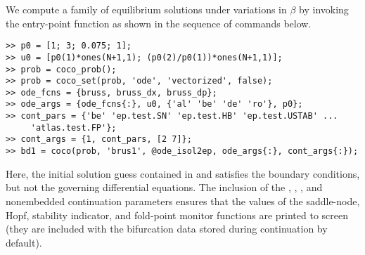 We compute a family of equilibrium solutions under variations in $\beta$ by invoking the  entry-point function as shown in the sequence of commands below.
\begin{lstlisting}[language=coco-highlight]
>> p0 = [1; 3; 0.075; 1];
>> u0 = [p0(1)*ones(N+1,1); (p0(2)/p0(1))*ones(N+1,1)];
>> prob = coco_prob();
>> prob = coco_set(prob, 'ode', 'vectorized', false);
>> ode_fcns = {bruss, bruss_dx, bruss_dp};
>> ode_args = {ode_fcns{:}, u0, {'al' 'be' 'de' 'ro'}, p0};
>> cont_pars = {'be' 'ep.test.SN' 'ep.test.HB' 'ep.test.USTAB' ...
     'atlas.test.FP'};
>> cont_args = {1, cont_pars, [2 7]};
>> bd1 = coco(prob, 'brus1', @ode_isol2ep, ode_args{:}, cont_args{:});
\end{lstlisting}
Here, the initial solution guess contained in  and  satisfies the boundary conditions, but not the governing differential equations. The inclusion of the , , , and  nonembedded continuation parameters ensures that the values of the saddle-node, Hopf, stability indicator, and fold-point monitor functions are printed to screen (they are included with the bifurcation data stored during continuation by default).

